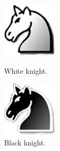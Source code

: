 \documentclass[12pt, a4paper]{article}
\begin{document}
\begin{figure}[h!]
\centering
\begin{minipage}{.5\textwidth}
  \centering
  \includegraphics[width=.4\linewidth]{figures/whiteknight.png}
  \caption{White knight.}
\end{minipage}%
\begin{minipage}{.5\textwidth}
  \centering
  \includegraphics[width=.4\linewidth]{figures/blackknight.png}
  \caption{Black knight.}
\end{minipage}
\end{figure}

\vfill
\clearpage

\newpage
\vfill
\end{document}
